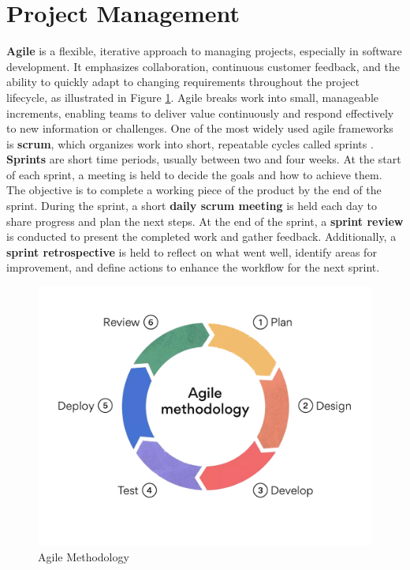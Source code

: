 \section{Project Management}
\label{sec:project-management}

\textbf{Agile} is a flexible, iterative approach to managing projects, especially in software development. It emphasizes collaboration, continuous customer feedback, and the ability to quickly adapt to changing requirements throughout the project lifecycle, as illustrated in Figure \ref{fig:agile-methodology}. Agile breaks work into small, manageable increments, enabling teams to deliver value continuously and respond effectively to new information or challenges. One of the most widely used agile frameworks is \textbf{\gls{scrum}}, which organizes work into short, repeatable cycles called sprints \cite{scrumguides:scrum}. \\

\textbf{Sprints} are short time periods, usually between two and four weeks. At the start of each sprint, a meeting is held to decide the goals and how to achieve them. The objective is to complete a working piece of the product by the end of the sprint. During the sprint, a short \textbf{daily \gls{scrum} meeting} is held each day to share progress and plan the next steps. At the end of the sprint, a \textbf{sprint review} is conducted to present the completed work and gather feedback. Additionally, a \textbf{sprint retrospective} is held to reflect on what went well, identify areas for improvement, and define actions to enhance the workflow for the next sprint. \\

\begin{figure}[h!]
    \centering
    \includegraphics[width=0.75\linewidth]{figures/theory/agile-methodology.png}
    \caption{Agile Methodology}
    \label{fig:agile-methodology}
\end{figure}

